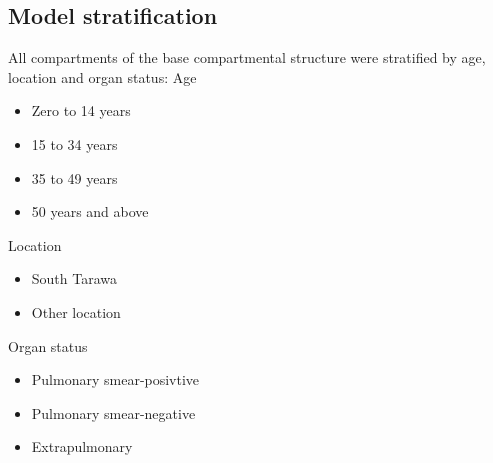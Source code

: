 \subsection{Model stratification}
All compartments of the base compartmental structure were stratified by age, location and organ status:\linebreak
Age
\begin{itemize}
    \item Zero to 14 years
    \item 15 to 34 years
    \item 35 to 49 years
    \item 50 years and above
\end{itemize}
Location
\begin{itemize}
    \item South Tarawa
    \item Other location
\end{itemize}
Organ status
\begin{itemize}
    \item Pulmonary smear-posivtive
    \item Pulmonary smear-negative
    \item Extrapulmonary
\end{itemize}
